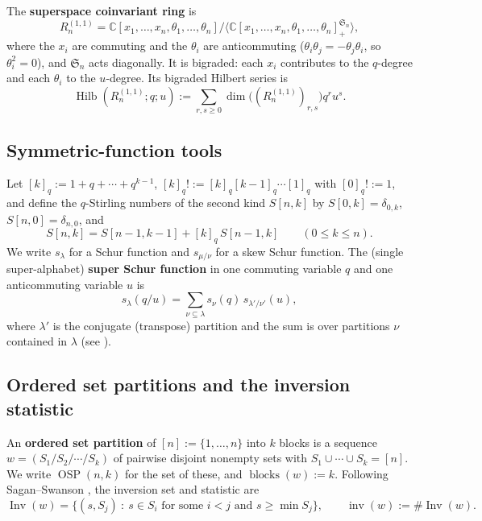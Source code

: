 \documentclass[11pt]{amsart}
\theoremstyle{definition}
\newcommand{\C}{\mathbb{C}}
\DeclareMathOperator{\Hilb}{Hilb}
\DeclareMathOperator{\OSP}{OSP}
\DeclareMathOperator{\inv}{inv}
\DeclareMathOperator{\Inv}{Inv}
\DeclareMathOperator{\blocks}{blocks}
\begin{document}
The \textbf{superspace coinvariant ring} is
\begin{equation}\label{eq:super-coinv}
R_n^{(1,1)} = \C[x_1,\ldots,x_n, \theta_1, \ldots,\theta_n]
/\big\langle \C[x_1,\ldots,x_n, \theta_1, \ldots,\theta_n]_+^{\mathfrak{S}_n}
\big\rangle,
\end{equation}
where the $x_i$ are commuting and the $\theta_i$ are anticommuting
($\theta_i\theta_j=-\theta_j\theta_i$, so $\theta_i^2=0$), and $\mathfrak{S}_n$
acts diagonally. It is bigraded: each $x_i$ contributes to the $q$-degree and
each $\theta_i$ to the $u$-degree. Its bigraded Hilbert series is
\begin{equation}
\Hilb(R_n^{(1,1)}; q;u) :=
\sum_{r,s\ge0}\dim\big((R_n^{(1,1)})_{r,s}\big)q^{r}u^{s}.
\end{equation}

\subsection{Symmetric-function tools}
Let $[k]_q := 1+q+\cdots+q^{k-1}$, $[k]_q!:=[k]_q[k-1]_q\cdots[1]_q$ with
$[0]_q!:=1$, and define the $q$-Stirling numbers of the second kind $S[n,k]$ by
$S[0,k]=\delta_{0,k}$, $S[n,0]=\delta_{n,0}$, and
\begin{equation}\label{eq:stirling}
S[n,k] = S[n-1,k-1] + [k]_q\,S[n-1,k]\qquad (0\le k\le n).
\end{equation}
We write $s_\lambda$ for a Schur function and $s_{\mu/\nu}$ for a skew Schur
function. The (single super-alphabet) \textbf{super Schur function} in one
commuting variable $q$ and one anticommuting variable $u$ is
\begin{equation}\label{eq:superschur-def}
s_\lambda(q/u) = \sum_{\nu \subseteq \lambda}
s_\nu(q)\,s_{\lambda'/\nu'}(u),
\end{equation}
where $\lambda'$ is the conjugate (transpose) partition and the sum is over
partitions $\nu$ contained in $\lambda$
(see \cite[Sections A.2.2 and 3.2]{ChengWangBook}).

\subsection{Ordered set partitions and the inversion statistic}
An \textbf{ordered set partition} of $[n]:=\{1,\dots,n\}$ into $k$ blocks is a
sequence $w=(S_1/S_2/\cdots/S_k)$ of pairwise disjoint nonempty sets with
$S_1\cup\cdots\cup S_k=[n]$. We write $\OSP(n,k)$ for the set of these, and
$\blocks(w):=k$. Following Sagan--Swanson \cite[Section 5.1]{SaganSwanson2024},
the inversion set and statistic are
\begin{equation}
\Inv(w) = \{(s,S_j)\ :\ s \in S_i \text{ for some } i < j
\text{ and } s \geq \min S_j\},\qquad \inv(w):=\#\Inv(w).
\end{equation}
\end{document}
